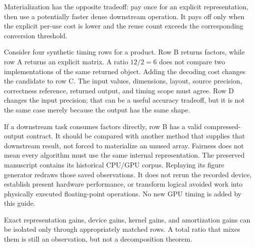 Materialization has the opposite tradeoff: pay once for an explicit representation, then use a potentially faster dense downstream operation. It pays off only when the explicit per-use cost is lower and the reuse count exceeds the corresponding conversion threshold.

Consider four synthetic timing rows for a product. Row B returns factors, while row A returns an explicit matrix. A ratio $12/2=6$ does not compare two implementations of the same returned object. Adding the decoding cost changes the candidate to row C.
The input values, dimensions, layout, source precision, correctness reference, returned output, and timing scope must agree. Row D changes the input precision; that can be a useful accuracy tradeoff, but it is not the same case merely because the output has the same shape.

If a downstream task consumes factors directly, row B has a valid compressed-output contract. It should be compared with another method that supplies that downstream result, not forced to materialize an unused array. Fairness does not mean every algorithm must use the same internal representation.
The preserved manuscript contains its historical CPU/GPU corpus. Replaying its figure generator redraws those saved observations. It does not rerun the recorded device, establish present hardware performance, or transform logical avoided work into physically executed floating-point operations. No new GPU timing is added by this guide.

Exact representation gains, device gains, kernel gains, and amortization gains can be isolated only through appropriately matched rows. A total ratio that mixes them is still an observation, but not a decomposition theorem.

